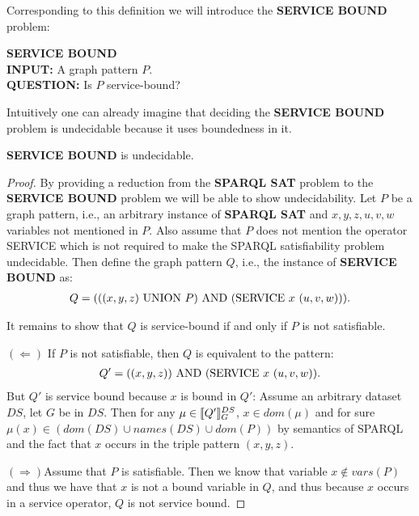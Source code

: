 Corresponding to this definition we will introduce the \textbf{SERVICE BOUND}
problem:
\begin{framed}\noindent \textbf{SERVICE BOUND}\\
	\textbf{INPUT:} A graph pattern $P$.\\
	\textbf{QUESTION:} Is $P$ service-bound?
\end{framed}

Intuitively one can already imagine that deciding the \textbf{SERVICE BOUND}
problem is undecidable because it uses boundedness in it.

\begin{theorem}
	\textbf{SERVICE BOUND} is undecidable.
\end{theorem}
\begin{proof}
By providing a reduction from the \textbf{SPARQL SAT} problem to the  
\textbf{SERVICE BOUND} problem we will be able to show undecidability.
Let $P$ be a graph pattern, i.e., an arbitrary instance of \textbf{SPARQL SAT} and
$x,y,z,u,v,w$ variables not mentioned in $P$.
Also assume that $P$ does not mention the operator SERVICE which is not required
to make the SPARQL satisfiability problem undecidable.
Then define the graph pattern $Q$, i.e., the instance of \textbf{SERVICE BOUND} as: 
\begin{align*}
	Q = (((x,y,z) \mbox{ UNION }  P) \mbox{ AND } (\mbox{SERVICE } x \ (u, v, w))).
\end{align*}

\noindent It remains to show that $Q$ is service-bound if and only if $P$ is not
satisfiable.

\bigskip\noindent
$(\Leftarrow)$ \quad If $P$ is not satisfiable, then $Q$ is equivalent to the
pattern: 
\begin{align*}
	Q' = ((x,y,z)) \mbox{ AND } (\mbox{SERVICE} \ x \ (u, v, w)).
\end{align*} 
But $Q'$ is service bound because $x$ is bound in $Q'$: Assume an
arbitrary dataset $DS$, let $G$ be in $DS$. Then 
for any $\mu \in \llbracket Q' \rrbracket^{DS}_G$, $x \in dom(\mu)$ and for sure $\mu(x) \in
(dom(DS) \cup names(DS) \cup dom(P))$ by semantics of SPARQL and the fact that
$x$ occurs in the triple pattern $(x,y,z)$.


\bigskip\noindent
$(\Rightarrow)$\quad Assume that $P$ is satisfiable. Then we know that variable
$x \not\in vars(P)$ and thus we have that $x$ is not a bound variable in $Q$,
and thus because $x$ occurs in a service operator, $Q$ is not service bound.
\end{proof}

